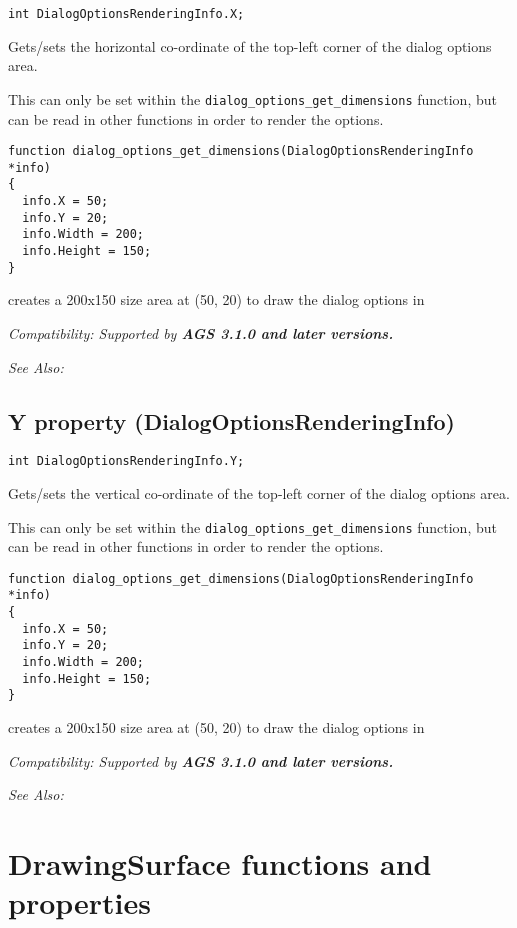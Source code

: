 \begin{verbatim}
int DialogOptionsRenderingInfo.X;
\end{verbatim}
Gets/sets the horizontal co-ordinate of the top-left corner of the dialog options area.

This can only be set within the \verb$dialog_options_get_dimensions$ function, but
can be read in other functions in order to render the options.

\begin{verbatim}
function dialog_options_get_dimensions(DialogOptionsRenderingInfo *info)
{
  info.X = 50;
  info.Y = 20;
  info.Width = 200;
  info.Height = 150;
}
\end{verbatim}
creates a 200x150 size area at (50, 20) to draw the dialog options in

\it{Compatibility:} Supported by \bf{AGS 3.1.0} and later versions.

\it{See Also:} 


\subsection{Y property (DialogOptionsRenderingInfo)}\label{DialogOptionsRenderingInfo.Y}%

\begin{verbatim}
int DialogOptionsRenderingInfo.Y;
\end{verbatim}
Gets/sets the vertical co-ordinate of the top-left corner of the dialog options area.

This can only be set within the \verb$dialog_options_get_dimensions$ function, but
can be read in other functions in order to render the options.

\begin{verbatim}
function dialog_options_get_dimensions(DialogOptionsRenderingInfo *info)
{
  info.X = 50;
  info.Y = 20;
  info.Width = 200;
  info.Height = 150;
}
\end{verbatim}
creates a 200x150 size area at (50, 20) to draw the dialog options in

\it{Compatibility:} Supported by \bf{AGS 3.1.0} and later versions.

\it{See Also:} 



\section{DrawingSurface functions and properties}\label{DrawingSurfaceFunctions}%

